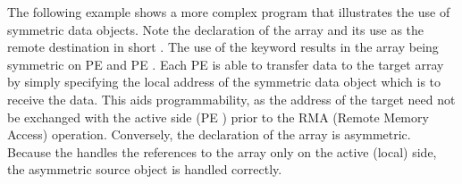 The following example shows a more complex \openshmem program that illustrates the use of symmetric data objects. Note the declaration of the   array and its use as the remote destination in \openshmem short . The use of the  keyword results in the  array being symmetric on \ac{PE}  and \ac{PE} . Each \ac{PE} is able to transfer data to the target array by simply specifying the local address of the symmetric data object which is to receive the data. This aids programmability, as the address of the target need not be exchanged with the active side (\ac{PE} ) prior to the RMA (Remote Memory Access) operation. Conversely, the declaration of the  array is asymmetric. Because the  handles the references to the  array only on the active (local) side, the asymmetric source object is handled correctly.

\begin{minipage}{\linewidth}
\vspace{0.1in}
\vspace{0.1in}
\end{minipage}
